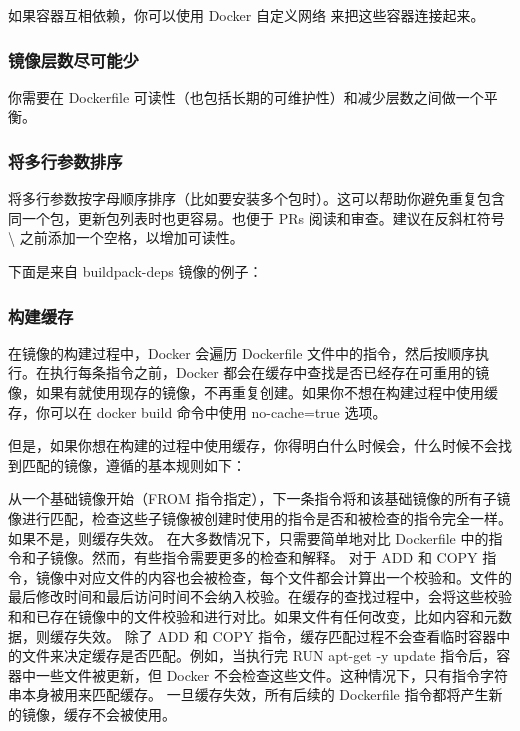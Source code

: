 \documentclass[letterpaper,10pt,english]{sphinxmanual}
\begin{document}
如果容器互相依赖，你可以使用 Docker 自定义网络 来把这些容器连接起来。


\subsubsection{镜像层数尽可能少}
\label{\detokenize{docker/appendix:id8}}
你需要在 Dockerfile 可读性（也包括长期的可维护性）和减少层数之间做一个平衡。


\subsubsection{将多行参数排序}
\label{\detokenize{docker/appendix:id9}}
将多行参数按字母顺序排序（比如要安装多个包时）。这可以帮助你避免重复包含同一个包，更新包列表时也更容易。也便于 PRs 阅读和审查。建议在反斜杠符号 \textbackslash{} 之前添加一个空格，以增加可读性。

下面是来自 buildpack-deps 镜像的例子：

\begin{sphinxVerbatim}[commandchars=\\\{\}]
       \PYGZbs{}
   \PYGZbs{}
   \PYGZbs{}
   \PYGZbs{}
   \PYGZbs{}
\end{sphinxVerbatim}


\subsubsection{构建缓存}
\label{\detokenize{docker/appendix:id10}}
在镜像的构建过程中，Docker 会遍历 Dockerfile 文件中的指令，然后按顺序执行。在执行每条指令之前，Docker 都会在缓存中查找是否已经存在可重用的镜像，如果有就使用现存的镜像，不再重复创建。如果你不想在构建过程中使用缓存，你可以在 docker build 命令中使用 \textendash{}no-cache=true 选项。

但是，如果你想在构建的过程中使用缓存，你得明白什么时候会，什么时候不会找到匹配的镜像，遵循的基本规则如下：

从一个基础镜像开始（FROM 指令指定），下一条指令将和该基础镜像的所有子镜像进行匹配，检查这些子镜像被创建时使用的指令是否和被检查的指令完全一样。如果不是，则缓存失效。
在大多数情况下，只需要简单地对比 Dockerfile 中的指令和子镜像。然而，有些指令需要更多的检查和解释。
对于 ADD 和 COPY 指令，镜像中对应文件的内容也会被检查，每个文件都会计算出一个校验和。文件的最后修改时间和最后访问时间不会纳入校验。在缓存的查找过程中，会将这些校验和和已存在镜像中的文件校验和进行对比。如果文件有任何改变，比如内容和元数据，则缓存失效。
除了 ADD 和 COPY 指令，缓存匹配过程不会查看临时容器中的文件来决定缓存是否匹配。例如，当执行完 RUN apt-get -y update 指令后，容器中一些文件被更新，但 Docker 不会检查这些文件。这种情况下，只有指令字符串本身被用来匹配缓存。
一旦缓存失效，所有后续的 Dockerfile 指令都将产生新的镜像，缓存不会被使用。
\end{document}
